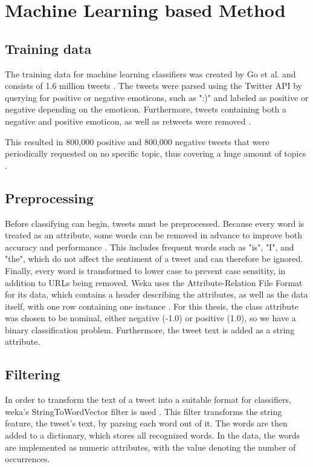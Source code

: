 \section{Machine Learning based Method}

\subsection{Training data}
The training data for machine learning classifiers was created by Go et al. and consists of 1.6 million tweets \cite{GoBHaHua2009}. The tweets were parsed using the Twitter API by querying for positive or negative emoticons, such as ":)" and labeled as positive or negative depending on the emoticon. Furthermore, tweets containing both a negative and positive emoticon, as well as retweets were removed \cite{GoBHaHua2009}.

This resulted in 800,000 positive and 800,000 negative tweets that were periodically requested on no specific topic, thus covering a huge amount of topics \cite{GoBHaHua2009}.
\subsection{Preprocessing}
Before classifying can begin, tweets must be preprocessed. Because every word is treated as an attribute, some words can be removed in advance to improve both accuracy and performance . This includes frequent words such as "is", "I", and "the", which do not affect the sentiment of a tweet and can therefore be ignored. Finally, every word is transformed to lower case to prevent case sensitity, in addition to URLs being removed. Weka uses the Attribute-Relation File Format for its data, which contains a header describing the attributes, as well as the data itself, with one row containing one instance \cite{weka}. For this thesis, the class attribute was chosen to be nominal, either negative (-1.0) or positive (1.0), so we have a binary classification problem. Furthermore, the tweet text is added as a string attribute.

\subsection{Filtering}
In order to transform the text of a tweet into a suitable format for classifiers, weka's StringToWordVector filter is used \cite{weka}. This filter transforms the string feature, the tweet's text, by parsing each word out of it. The words are then added to a dictionary, which stores all recognized words. In the data, the words are implemented as numeric attributes, with the value denoting the number of occurrences.

